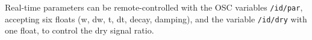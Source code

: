 
Real-time parameters can be remote-controlled with the OSC variables
\verb!/id/par!, accepting six floats (w, dw, t, dt, decay, damping),
and the variable \verb!/id/dry! with one float, to control the dry
signal ratio.
